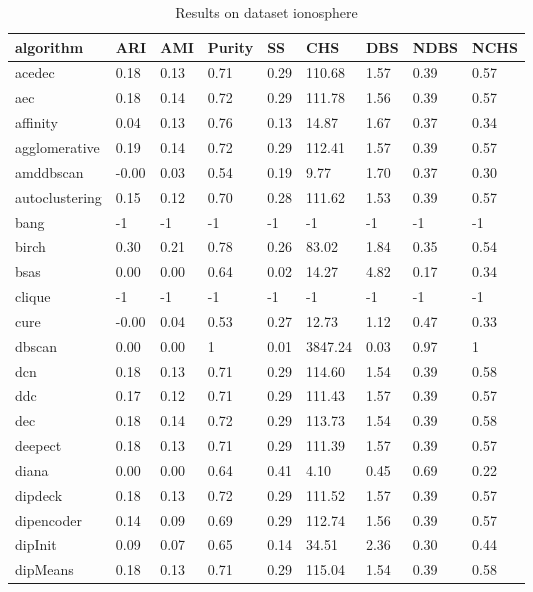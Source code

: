 \begin{table}[H]
\centering
\caption{Results on dataset ionosphere}
\label{tab:params:ionosphere}
\begin{tabular}{|l|l|l|l|l|l|l|l|l|}
\hline
algorithm & ARI & AMI & Purity & SS & CHS & DBS & NDBS & NCHS \\
\hline
acedec & 0.18 & 0.13 & 0.71 & 0.29 & 110.68 & 1.57 & 0.39 & 0.57 \\
\hline
aec & 0.18 & 0.14 & 0.72 & 0.29 & 111.78 & 1.56 & 0.39 & 0.57 \\
\hline
affinity & 0.04 & 0.13 & 0.76 & 0.13 & 14.87 & 1.67 & 0.37 & 0.34 \\
\hline
agglomerative & 0.19 & 0.14 & 0.72 & 0.29 & 112.41 & 1.57 & 0.39 & 0.57 \\
\hline
amddbscan & -0.00 & 0.03 & 0.54 & 0.19 & 9.77 & 1.70 & 0.37 & 0.30 \\
\hline
autoclustering & 0.15 & 0.12 & 0.70 & 0.28 & 111.62 & 1.53 & 0.39 & 0.57 \\
\hline
bang & -1 & -1 & -1 & -1 & -1 & -1 & -1 & -1 \\
\hline
birch & 0.30 & 0.21 & 0.78 & 0.26 & 83.02 & 1.84 & 0.35 & 0.54 \\
\hline
bsas & 0.00 & 0.00 & 0.64 & 0.02 & 14.27 & 4.82 & 0.17 & 0.34 \\
\hline
clique & -1 & -1 & -1 & -1 & -1 & -1 & -1 & -1 \\
\hline
cure & -0.00 & 0.04 & 0.53 & 0.27 & 12.73 & 1.12 & 0.47 & 0.33 \\
\hline
dbscan & 0.00 & 0.00 & 1 & 0.01 & 3847.24 & 0.03 & 0.97 & 1 \\
\hline
dcn & 0.18 & 0.13 & 0.71 & 0.29 & 114.60 & 1.54 & 0.39 & 0.58 \\
\hline
ddc & 0.17 & 0.12 & 0.71 & 0.29 & 111.43 & 1.57 & 0.39 & 0.57 \\
\hline
dec & 0.18 & 0.14 & 0.72 & 0.29 & 113.73 & 1.54 & 0.39 & 0.58 \\
\hline
deepect & 0.18 & 0.13 & 0.71 & 0.29 & 111.39 & 1.57 & 0.39 & 0.57 \\
\hline
diana & 0.00 & 0.00 & 0.64 & 0.41 & 4.10 & 0.45 & 0.69 & 0.22 \\
\hline
dipdeck & 0.18 & 0.13 & 0.72 & 0.29 & 111.52 & 1.57 & 0.39 & 0.57 \\
\hline
dipencoder & 0.14 & 0.09 & 0.69 & 0.29 & 112.74 & 1.56 & 0.39 & 0.57 \\
\hline
dipInit & 0.09 & 0.07 & 0.65 & 0.14 & 34.51 & 2.36 & 0.30 & 0.44 \\
\hline
dipMeans & 0.18 & 0.13 & 0.71 & 0.29 & 115.04 & 1.54 & 0.39 & 0.58 \\

\end{tabular}
\end{table}
